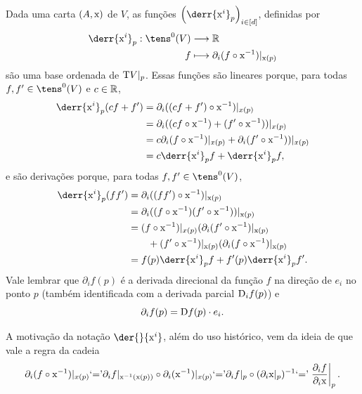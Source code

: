 Dada uma carta $(A,\mathrm{x})$ de $V$, as funções $\left( \derr{\x^i}_p \right)_{i \in [d]}$, definidas por
	\begin{align*}
	\func{\derr{\x^i}_p}{\tens^0(V)}{\R}{f}{\partial_i(f \circ \x\inv)|_{\x(p)}}
	\end{align*}
são uma base ordenada de $\mathrm{T} V|_p$. Essas funções são lineares porque, para todas $f,f' \in \tens^0(V)$ e $c \in \mathbb{R}$,
	\begin{align*}
	\derr{\x^i}_p(cf+f') &= \partial_i((cf+f') \circ \x\inv)|_{x(p)} \\
		&= \partial_i((cf \circ \x\inv) + (f' \circ \x\inv))|_{x(p)} \\
		&= c\partial_i(f \circ \x\inv)|_{x(p)} + \partial_i(f' \circ \x\inv))|_{x(p)} \\
		&= c\derr{\x^i}_p f + \derr{\x^i}_p f,
	\end{align*}
e são derivações porque, para todas $f,f' \in \tens^0(V)$,
	\begin{align*}
	\derr{\x^i}_p(ff') &= \partial_i ((ff') \circ \x\inv)|_{\x(p)} \\
		&= \partial_i ((f \circ \x\inv)(f' \circ \x\inv))|_{\x(p)} \\
		&= (f \circ \x\inv)|_{x(p)}(\partial_i (f' \circ \x\inv)|_{\x(p)} \\
		&\qquad + (f' \circ \x\inv)|_{\x(p)}(\partial_i (f \circ \x\inv)|_{\x(p)} \\
		&= f(p)\derr{\x^i}_p f +  f'(p)\derr{\x^i}_p f'.
	\end{align*}
Vale lembrar que $\partial_i f(p)$ é a derivada direcional da função $f$ na direção de $e_i$ no ponto $p$ (também identificada com a derivada parcial $\mathrm{D}_i f(p)$) e
	\begin{equation*}
	\partial_i f(p) = \mathrm{D} f(p) \cdot e_i.
	\end{equation*}

A motivação da notação $\der{}{\x^i}$, além do uso histórico, vem da ideia de que vale a regra da cadeia
	\begin{align*}
	\partial_i(f \circ \mathrm{x}^{-1})|_{x(p)} \text{`='} \partial_i f|_{\mathrm{x}^{-1}(\mathrm{x}(p))} \circ \partial_i(\mathrm{x}^{-1})|_{x(p)} \text{`='} \partial_i f|_p \circ (\partial_i \mathrm{x}|_p)^{-1} \text{`='} \left.\frac{\partial_i f}{\partial_i \mathrm{x}}\right|_p.
	\end{align*}

